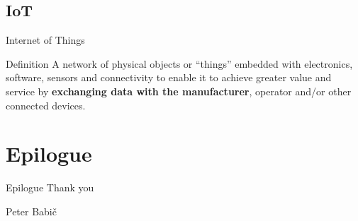 \documentclass[hyperref={unicode}]{beamer}
\begin{document}
\subsection{IoT}

\begin{frame}{Internet of Things}
	\begin{block}{Definition}
	A network of physical objects or “things” embedded with electronics, software, sensors and connectivity to enable it to achieve greater value and service by \textbf{exchanging data with the manufacturer}, operator and/or other connected devices.
	\end{block}
\end{frame}


\section{Epilogue}

\begin{frame}{Epilogue}
	\centering
	{\large Thank you}
	
	\vskip 2cm
	Peter Babič	

\end{frame}
\end{document}
